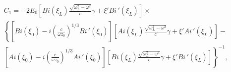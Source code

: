 \documentclass[12pt,a4paper]{article}
\numberwithin{equation}{section}
\begin{document}
\begin{equation}
    \label{C1_common}
    \begin{array}{lcl}
         C_1 = -2E_0\left[Bi\left(\xi_L\right)\frac{\sqrt{\omega_L^2-\omega^2}}{c}\gamma+\xi'Bi\,'\left(\xi_L\right)\right]\times \\
       \left\{\left[Bi\left(\xi_0\right)-i\left(\frac{c}{\omega z_0}\right)^{1/3}Bi\,'\left(\xi_0\right)\right]\left[Ai\left(\xi_L\right)\frac{\sqrt{\omega_L^2-\omega^2}}{c}\gamma+\xi'Ai\,'\left(\xi_L\right)\right] - \right.\\ 
       \left.\left[Ai\left(\xi_0\right)-i\left(\frac{c}{\omega z_0}\right)^{1/3}Ai\,'\left(\xi_0\right)\right]\left[Bi\left(\xi_L\right)\frac{\sqrt{\omega_L^2-\omega^2}}{c}\gamma+\xi'Bi\,'\left(\xi_L\right)\right]\right\}^{-1},
    \end{array}
\end{equation}
\end{document}
